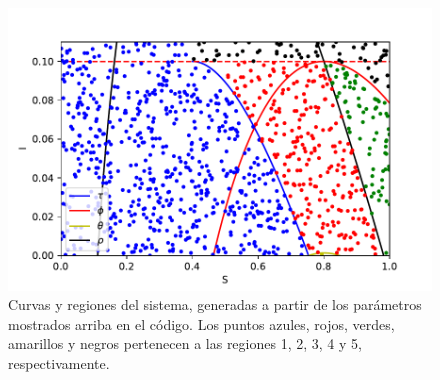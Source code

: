 \documentclass{article}
\begin{document}
\begin{figure}
\centering
\includegraphics[width = \textwidth]{regions.pdf}
\caption{Curvas y regiones del sistema, generadas a partir de los parámetros mostrados arriba en el código. Los puntos azules, rojos, verdes, amarillos y negros pertenecen a las regiones 1, 2, 3, 4 y 5, respectivamente.}
\label{fig:regiones}
\end{figure}
\end{document}
